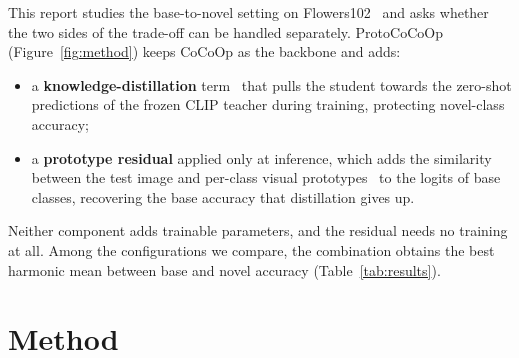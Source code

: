 \documentclass[10pt,twocolumn,a4paper]{article}
\begin{document}
This report studies the base-to-novel setting on Flowers102~\cite{flowers} and asks
whether the two sides of the trade-off can be handled separately. ProtoCoCoOp
(Figure~\ref{fig:method}) keeps CoCoOp as the backbone and adds:
\begin{itemize}
  \item a \textbf{knowledge-distillation} term~\cite{kd} that pulls the student towards
        the zero-shot predictions of the frozen CLIP teacher during training, protecting
        novel-class accuracy;
  \item a \textbf{prototype residual} applied only at inference, which adds the
        similarity between the test image and per-class visual
        prototypes~\cite{protonets,tipadapter} to the logits of base classes, recovering
        the base accuracy that distillation gives up.
\end{itemize}
Neither component adds trainable parameters, and the residual needs no training at all.
Among the configurations we compare, the combination obtains the best harmonic mean
between base and novel accuracy (Table~\ref{tab:results}).

\section{Method}
\end{document}

